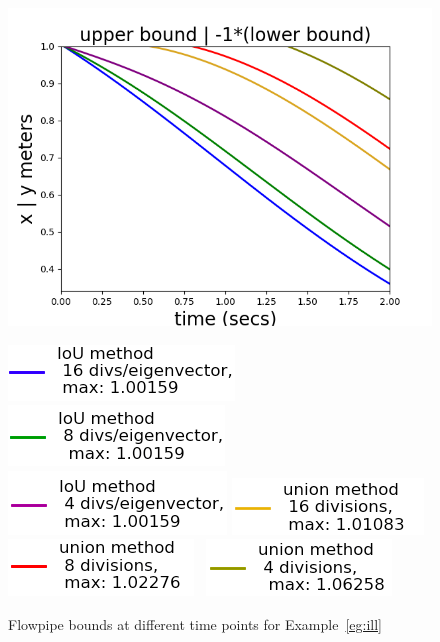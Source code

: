 \begin{figure}
{\center
  \includegraphics[scale = 0.5]{illImages/Ub.png}
  
  \includegraphics[scale = 0.41]{illImages/leg1.png}~
  \includegraphics[scale = 0.41]{illImages/leg2.png}~
  \includegraphics[scale = 0.41]{illImages/leg3.png}
    \includegraphics[scale = 0.41]{illImages/leg4.png}~
  \includegraphics[scale = 0.41]{illImages/leg5.png}~
  \includegraphics[scale = 0.41]{illImages/leg6.png}

  }
  \caption{Flowpipe bounds at different time points for
    Example~\ref{eg:ill}}
  \label{fig:ill}
\end{figure}
%
